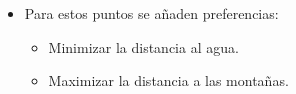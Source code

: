 \begin{frame}
\begin{itemize}
\begin{itemize}
		\vspace{0.5em}
		
		\item<4-> Para estos puntos se añaden preferencias:
		
		\vspace{0.5em}
		\begin{itemize}
			\item<4-> \textcolor{UDCpink}{Minimizar la distancia al agua}.
			
			\vspace{0.5em}
			
			\item<5-> \textcolor{UDCpink}{Maximizar la distancia a las montañas}.
		\end{itemize}
	\end{itemize}
\end{itemize}

\end{frame}